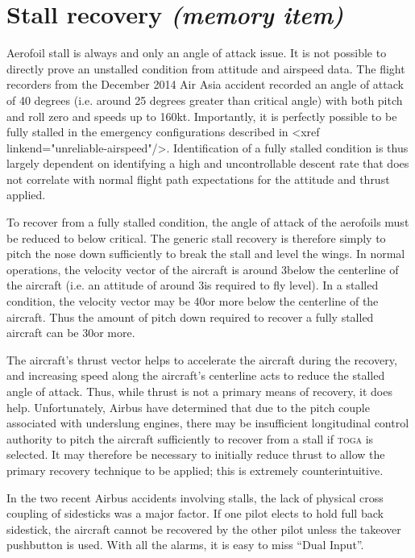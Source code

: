 \documentclass[a5paper,11pt,twoside]{book}
\newcommand{\ac}[1]{{\scshape\MakeLowercase{#1}}}
\newcommand{\inlcite}[1]{{\ac{#1}}}
\newcommand{\multicite}[1]{%
  \nopagebreak
  \noindent{{\color{blue}\footnotesize[ \inlcite{#1} ]}}
}
\begin{document}
\multicite{QRH~AER.80, FCOM~PRO.AER.MISC}

\section{Stall recovery \emph{(memory item)}}

Aerofoil stall is always and only an angle of attack issue. It is not possible
to directly prove an unstalled condition from attitude and airspeed data. The
flight recorders from the December 2014 Air Asia accident recorded an angle of
attack of 40 degrees (i.e. around 25 degrees greater than critical angle) with
both pitch and roll zero and speeds up to 160kt. Importantly, it is perfectly
possible to be fully stalled in the emergency configurations described in <xref
linkend="unreliable-airspeed"/>. Identification of a fully stalled condition is
thus largely dependent on identifying a high and uncontrollable descent rate
that does not correlate with normal flight path expectations for the attitude
and thrust applied.

To recover from a fully stalled condition, the angle of attack of the aerofoils
must be reduced to below critical. The generic stall recovery is therefore
simply to pitch the nose down sufficiently to break the stall and level the
wings. In normal operations, the velocity vector of the aircraft is around
3\textdegree{ }below the centerline of the aircraft (i.e. an attitude of around
3\textdegree{ }is required to fly level). In a stalled condition, the velocity
vector may be 40\textdegree{ }or more below the centerline of the
aircraft. Thus the amount of pitch down required to recover a fully stalled
aircraft can be 30\textdegree{ }or more.

The aircraft's thrust vector helps to accelerate the aircraft during the
recovery, and increasing speed along the aircraft's centerline acts to reduce
the stalled angle of attack. Thus, while thrust is not a primary means of
recovery, it does help. Unfortunately, Airbus have determined that due to the
pitch couple associated with underslung engines, there may be insufficient
longitudinal control authority to pitch the aircraft sufficiently to recover
from a stall if \ac{TOGA} is selected. It may therefore be necessary to
initially reduce thrust to allow the primary recovery technique to be applied;
this is extremely counterintuitive.

In the two recent Airbus accidents involving stalls, the lack of physical cross
coupling of sidesticks was a major factor. If one pilot elects to hold full back
sidestick, the aircraft cannot be recovered by the other pilot unless the
takeover pushbutton is used. With all the alarms, it is easy to miss ``Dual
Input''.
\end{document}
